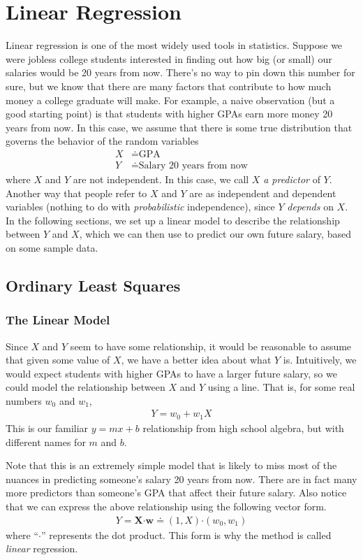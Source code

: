 \documentclass[11pt,letterpaper]{article}
\numberwithin{theorem}{section}
\numberwithin{definition}{section}
\numberwithin{lemma}{section}
\numberwithin{corollary}{section}
\numberwithin{proposition}{section}
\theoremstyle{definition}
\numberwithin{remark}{section}
\numberwithin{claim}{section}
\numberwithin{observation}{section}
\numberwithin{fact}{section}
\numberwithin{assumption}{section}
\numberwithin{example}{section}
\numberwithin{exercise}{section}
\begin{document}
\section{Linear Regression}
Linear regression is one of the most widely used tools in statistics. Suppose we were jobless college students interested in finding out how big (or small) our salaries would be 20 years from now. There's no way to pin down this number for sure, but we know that there are many factors that contribute to how much money a college graduate will make. For example, a naive observation (but a good starting point) is that students with higher GPAs earn more money 20 years from now. In this case, we assume that there is some true distribution that governs the behavior of the random variables
\begin{align*}
X &\doteq \text{GPA} \\
Y &\doteq \text{Salary 20 years from now}
\end{align*}
where $X$ and $Y$ are not independent. In this case, we call $X$ \textit{a predictor} of $Y$. Another way that people refer to $X$ and $Y$ are as  independent and dependent variables (nothing to do with \textit{probabilistic} independence), since $Y$ \textit{depends} on $X$. In the following sections, we set up a linear model to describe the relationship between $Y$ and $X$, which we can then use to predict our own future salary, based on some sample data.


\subsection{Ordinary Least Squares}

\subsubsection{The Linear Model}
Since $X$ and $Y$ seem to have some relationship, it would be reasonable to assume that given some value of $X$, we have a better idea about what $Y$ is. Intuitively, we would expect students with higher GPAs to have a larger future salary, so we could model the relationship between $X$ and $Y$ using a line. That is, for some real numbers $w_0$ and $w_1$, 
\begin{align*}
Y = w_0 + w_1 X 
\end{align*}
This is our familiar $y = mx + b$ relationship from high school algebra, but with different names for $m$ and $b$. 

Note that this is an extremely simple model that is likely to miss most of the nuances in predicting someone's salary 20 years from now. There are in fact many more predictors than someone's GPA that affect their future salary. Also notice that we can express the above relationship using the following vector form.
\begin{align*}
Y = \textbf{X} \boldsymbol{\cdot} \textbf{w} \doteq (1,X)  \boldsymbol{\cdot} (w_0, w_1)
\end{align*}
where ``$\boldsymbol{\cdot}$'' represents the dot product. This form is why the method is called \textit{linear} regression. 
\end{document}

